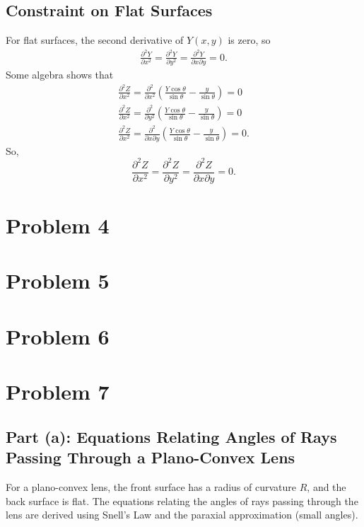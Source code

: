 \documentclass[a4paper]{article}
\begin{document}
\subsection{Constraint on Flat Surfaces}
For flat surfaces, the second derivative of $Y(x, y)$ is zero, so
\begin{align*}
    \frac{\partial^2 Y}{\partial x^2} = \frac{\partial^2 Y}{\partial y^2} = \frac{\partial^2 Y}{\partial x \partial y} = 0.
\end{align*}
Some algebra shows that
\begin{align*}
    \frac{\partial^2 Z}{\partial x^2} = \frac{\partial^2}{\partial x^2} \left( \frac{Y \cos \theta}{\sin \theta} - \frac{y}{\sin \theta} \right) = 0 \\
    \frac{\partial^2 Z}{\partial x^2} = \frac{\partial^2}{\partial y^2} \left( \frac{Y \cos \theta}{\sin \theta} - \frac{y}{\sin \theta} \right) = 0 \\
    \frac{\partial^2 Z}{\partial x^2} = \frac{\partial^2}{\partial x \partial y} \left( \frac{Y \cos \theta}{\sin \theta} - \frac{y}{\sin \theta} \right) = 0.
\end{align*}
So, 
$$\frac{\partial^2 Z}{\partial x^2} = \frac{\partial^2 Z}{\partial y^2} = \frac{\partial^2 Z}{\partial x \partial y} = 0.$$
\section{Problem 4}
\section{Problem 5}
\section{Problem 6}
\section{Problem 7}
\subsection*{Part (a): Equations Relating Angles of Rays Passing Through a Plano-Convex Lens}

For a plano-convex lens, the front surface has a radius of curvature \( R \), and the back surface is flat. The equations relating the angles of rays passing through the lens are derived using Snell's Law and the paraxial approximation (small angles).
\end{document}
